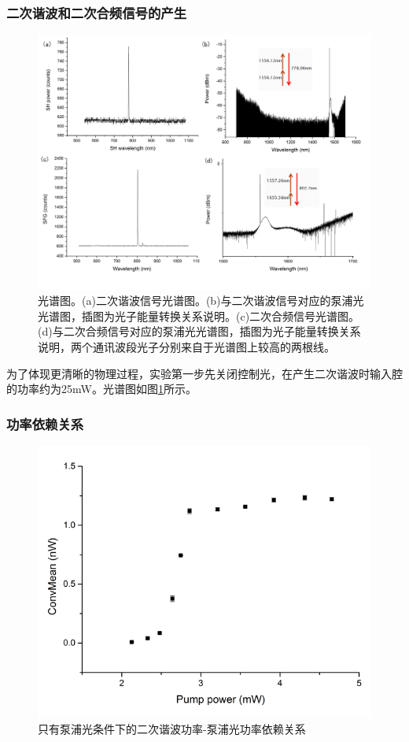 \documentclass[UTF8,a4paper,cs4size,hyperref]{ctexart}
\begin{document}
\subsubsection{二次谐波和二次合频信号的产生}

\begin{figure}
\centering
\includegraphics[width=14cm ]{Spectrum.png}
\caption{光谱图。(a)二次谐波信号光谱图。(b)与二次谐波信号对应的泵浦光光谱图，插图为光子能量转换关系说明。(c)二次合频信号光谱图。(d)与二次合频信号对应的泵浦光光谱图，插图为光子能量转换关系说明，两个通讯波段光子分别来自于光谱图上较高的两根线。}
\label{pic:Spectrum}
\end{figure}

为了体现更清晰的物理过程，实验第一步先关闭控制光，在产生二次谐波时输入腔的功率约为25mW。光谱图如图\ref{pic:Spectrum}所示。

\subsubsection{功率依赖关系}

\begin{figure}
\centering
\includegraphics[width=14cm ]{SimpPWDP.png}
\caption{只有泵浦光条件下的二次谐波功率-泵浦光功率依赖关系}
\label{pic:SimpPWDP}
\end{figure}
\end{document}
